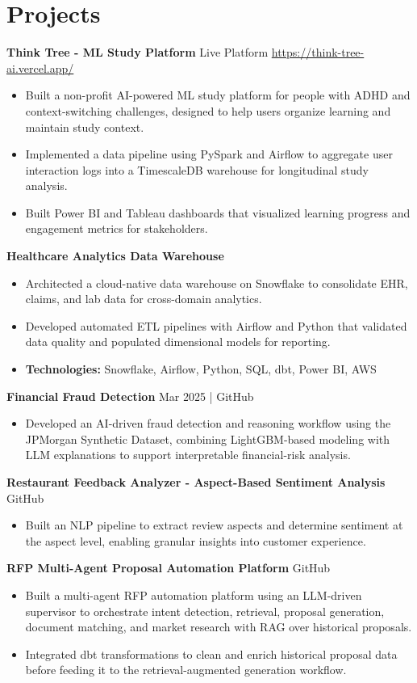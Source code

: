 \documentclass[10pt,a4paper]{article}
\begin{document}
\section{Projects}
\textbf{Think Tree - ML Study Platform} \textbar{} Live Platform \textbar{} \href{https://think-tree-ai.vercel.app/}{https://think-tree-ai.vercel.app/}\par
\begin{itemize}
  \item Built a non-profit AI-powered ML study platform for people with ADHD and context-switching challenges, designed to help users organize learning and maintain study context.
  \item Implemented a data pipeline using PySpark and Airflow to aggregate user interaction logs into a TimescaleDB warehouse for longitudinal study analysis.
  \item Built Power BI and Tableau dashboards that visualized learning progress and engagement metrics for stakeholders.
\end{itemize}
\textbf{Healthcare Analytics Data Warehouse}\par
\begin{itemize}
  \item Architected a cloud-native data warehouse on Snowflake to consolidate EHR, claims, and lab data for cross-domain analytics.
  \item Developed automated ETL pipelines with Airflow and Python that validated data quality and populated dimensional models for reporting.
  \item \textbf{Technologies:} Snowflake, Airflow, Python, SQL, dbt, Power BI, AWS
\end{itemize}
\textbf{Financial Fraud Detection} \textbar{} Mar 2025 | GitHub\par
\begin{itemize}
  \item Developed an AI-driven fraud detection and reasoning workflow using the JPMorgan Synthetic Dataset, combining LightGBM-based modeling with LLM explanations to support interpretable financial-risk analysis.
\end{itemize}
\textbf{Restaurant Feedback Analyzer - Aspect-Based Sentiment Analysis} \textbar{} GitHub\par
\begin{itemize}
  \item Built an NLP pipeline to extract review aspects and determine sentiment at the aspect level, enabling granular insights into customer experience.
\end{itemize}
\textbf{RFP Multi-Agent Proposal Automation Platform} \textbar{} GitHub\par
\begin{itemize}
  \item Built a multi-agent RFP automation platform using an LLM-driven supervisor to orchestrate intent detection, retrieval, proposal generation, document matching, and market research with RAG over historical proposals.
  \item Integrated dbt transformations to clean and enrich historical proposal data before feeding it to the retrieval-augmented generation workflow.
\end{itemize}
\end{document}
